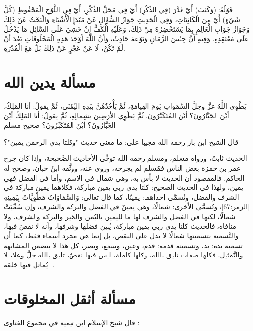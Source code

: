 قَوْلُهُ: (وَكَتَبَ) أَيْ قَدَّرَ (فِي الذِّكْرِ) أَيْ فِي مَحَلِّ الذِّكْرِ، أَيْ فِي اللَّوْحِ الْمَحْفُوظِ (كُلَّ شَيْءٍ) أَيْ مِنَ الْكَائِنَاتِ، وَفِي الْحَدِيثِ جَوَازُ السُّؤَالِ عَنْ مَبْدَإِ الْأَشْيَاءِ وَالْبَحْثُ عَنْ ذَلِكَ وَجَوَازُ جَوَابِ الْعَالِمِ بِمَا يَسْتَحْضِرُهُ مِنْ ذَلِكَ، وَعَلَيْهِ الْكَفُّ إِنْ خَشِيَ عَلَى السَّائِلِ مَا يَدْخُلُ عَلَى مُعْتَقِدِهِ. وَفِيهِ أَنَّ جِنْسَ الزَّمَانِ وَنَوْعَهُ حَادِثٌ، وَأَنَّ اللَّهَ أَوْجَدَ هَذِهِ الْمَخْلُوقَاتِ بَعْدَ أَنْ لَمْ تَكُنْ، لَا عَنْ عَجْزٍ عَنْ ذَلِكَ بَلْ مَعَ الْقُدْرَةِ.

\section{مسألة يدين الله}

يَطْوِي اللَّهُ عزَّ وجلَّ السَّمَواتِ يَومَ القِيامَةِ، ثُمَّ يَأْخُذُهُنَّ بيَدِهِ اليُمْنَى، ثُمَّ يقولُ: أنا المَلِكُ، أيْنَ الجَبَّارُونَ؟ أيْنَ المُتَكَبِّرُونَ. ثُمَّ يَطْوِي الأرَضِينَ بشِمالِهِ، ثُمَّ يقولُ: أنا المَلِكُ أيْنَ الجَبَّارُونَ؟ أيْنَ المُتَكَبِّرُونَ؟
صحيح مسلم

قال الشيخ ابن باز رحمه الله مجيبا على: ما معنى حديث "وكلتا يدي الرحمن يمين"؟

الحديث ثابتٌ، ورواه مسلم، ومسلم رحمه الله توخَّى الأحاديث الصَّحيحة، وإذا كان جرح عمر بن حمزة بعض الناس فمُسلم لم يجرحه، وروى عنه، ووثَّقه ابنُ حبان، وصحح له الحاكم.
فالمقصود أن الحديث لا بأس به، وهي شمال في الاسم، وأما في الفضل فهي يمين، ولهذا في الحديث الصحيح: كلتا يدي ربي يمين مباركة، فكلاهما يمين مباركة في الشرف والفضل، وتُسمَّى إحداهما: يمينًا، كما قال تعالى: وَالسَّمَاوَاتُ مَطْوِيَّاتٌ بِيَمِينِهِ [الزمر:67]، وتُسمَّى الأخرى: شمالًا، وهي يمينٌ في الفضل والبركة والشرف، وإن سُمِّيَتْ شمالًا، لكنها في الفضل والشرف لها ما لليمين باليُمن والخير والبركة والشرف، ولا منافاة، فالحديث كلتا يدي ربي يمين مباركة، يُبين فضلها وشرفها، وأنه لا نقصَ فيها، والتَّسمية بتسميتها شمالًا لا يدل على النقص، بل إنما هي مجرد أسماء فقط، كما أن تسمية يده: يد، وتسميته قدمه: قدم، وعين، وسمع، وبصر، كل هذا لا يتضمن المشابهة والتَّمثيل، فكلها صفات تليق بالله، وكلها كاملة، ليس فيها نقصٌ، تليق بالله جلَّ وعلا، لا يُماثل فيها خلقه .

\section{مسألة أثقل المخلوقات}

قال شيخ الإسلام ابن تيمية في مجموع الفتاوى \href{https://shamela.ws/book/7289/2991#p1}{\faExternalLink}:


